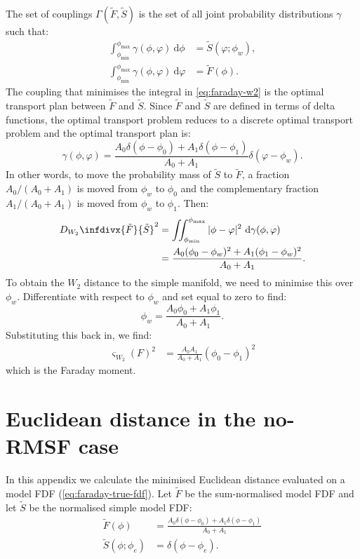     The set of couplings $\Gamma(\tilde F, \tilde S)$ is the set of all joint probability distributions $\gamma$ such that:
    \begin{align}
      \int_{\phi_{\min}}^{\phi_{\max}} \gamma(\phi, \varphi)\ \mathrm{d}\phi &= \tilde S(\varphi; \phi_w),\\
      \int_{\phi_{\min}}^{\phi_{\max}} \gamma(\phi, \varphi)\ \mathrm{d}\varphi &= \tilde F(\phi).
    \end{align}
    The coupling that minimises the integral in \autoref{eq:faraday-w2} is the optimal transport plan between $\tilde F$ and $\tilde S$. Since $\tilde F$ and $\tilde S$ are defined in terms of delta functions, the optimal transport problem reduces to a discrete optimal transport problem and the optimal transport plan is:
    \begin{equation}
      \gamma(\phi, \varphi) = \frac{A_0 \delta(\phi - \phi_0) + A_1 \delta(\phi - \phi_1)}{A_0 + A_1} \delta(\varphi - \phi_w).
    \end{equation}
    In other words, to move the probability mass of $\tilde S$ to $\tilde F$, a fraction $A_0/(A_0 + A_1)$ is moved from $\phi_w$ to $\phi_0$ and the complementary fraction $A_1/(A_0 + A_1)$ is moved from $\phi_w$ to $\phi_1$. Then:
    \begin{align}
      D_{W_2}\infdivx{\tilde F}{\tilde S}^2 &= \iint_{\phi_{\min}}^{\phi_{\max}} |\phi - \varphi|^2\ \mathrm{d}\gamma(\phi, \varphi)\\
        &= \frac{A_0 (\phi_0 - \phi_w)^2 + A_1 (\phi_1 - \phi_w)^2}{A_0 + A_1}.
    \end{align}
    To obtain the $W_2$ distance to the simple manifold, we need to minimise this over $\phi_w$. Differentiate with respect to $\phi_w$ and set equal to zero to find:
    \begin{equation}
      \phi_w = \frac{A_0 \phi_0 + A_1 \phi_1}{A_0 + A_1}.
    \end{equation}
    Substituting this back in, we find:
    \begin{align}
      \varsigma_{W_2}(F)^2 &= \frac{A_0 A_1}{A_0 + A_1}(\phi_0 - \phi_1)^2
    \end{align}
    which is the Faraday moment.

\section{Euclidean distance in the no-RMSF case}
\label{sec:faraday-euclidean-calculation}

  In this appendix we calculate the minimised Euclidean distance evaluated on a model FDF (\autoref{eq:faraday-true-fdf}). Let $\tilde F$ be the sum-normalised model FDF and let $\tilde S$ be the normalised simple model FDF:
  \begin{align}
    \tilde F(\phi) &= \frac{A_0 \delta(\phi - \phi_0) + A_1 \delta(\phi - \phi_1)}{A_0 + A_1}\\
    \tilde S(\phi; \phi_e) &= \delta(\phi - \phi_e).
  \end{align}

